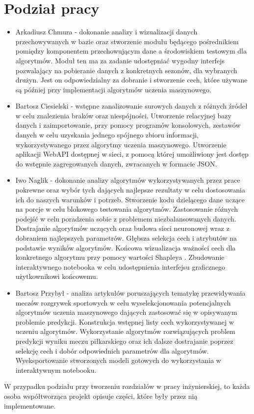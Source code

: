 \section{Podział pracy}
\begin{itemize}
    \item Arkadiusz Chmura - dokonanie analizy i wizualizacji danych przechowywanych w bazie oraz stworzenie modułu będącego pośrednikiem pomiędzy komponentem przechowującym dane a środowiskiem testowym dla algorytmów. Moduł ten ma za zadanie udostępniać wygodny interfejs pozwalający na pobieranie danych z konkretnych sezonów, dla wybranych drużyn. Jest on odpowiedzialny za dobranie i stworzenie cech, które używane są później przy implementacji algorytmów uczenia maszynowego.
    \item Bartosz Ciesielski - wstępne zanalizowanie surowych danych z różnych źródeł w celu znalezienia braków oraz niespójności. Utworzenie relacyjnej bazy danych i zaimportowanie, przy pomocy programów konsolowych, zestawów danych w celu uzyskania jednego spójnego zbioru informacji, wykorzystywanego przez algorytmy uczenia maszynowego. Utworzenie aplikacji WebAPI  dostępnej w sieci, z pomocą której umożliwiony jest dostęp do wstępnie zagregowanych danych, zwracanych w formacie JSON.
    \item Iwo Naglik - dokonanie analizy algorytmów wykorzystywanych przez prace pokrewne oraz wybór tych dających najlepsze rezultaty w celu dostosowania ich do naszych warunków i potrzeb. Stworzenie kodu dzielącego dane uczące na porcje w celu blokowego testowania algorytmów. Zastosowanie różnych podejść w celu poradzenia sobie z problemem niezbalansowanych danych. Dostrajanie algorytmów uczących oraz budowa sieci neuronowej wraz z dobraniem najlepszych parametrów. Głębsza selekcja cech i atrybutów na podstawie wyników algorytmów. Końcowa wizualizacja ważności cech dla konkretnego algorytmu przy pomocy wartości Shapleya \cite{shapley}. Zbudowanie interaktywnego notebooka w celu udostępnienia interfejsu graficznego użytkownikowi końcowemu.
    \item Bartosz Przybył - analiza artykułów poruszających tematykę przewidywania meczów rozgrywek sportowych w celu wyselekcjonowania potencjalnych algorytmów uczenia maszynowego dających zastosować się w opisywanym problemie predykcji. Konstrukcja wstępnej listy cech wykorzystywanej w uczeniu algorytmów. Wykorzystanie algorytmów rozwiązujących problem predykcji wyniku meczu piłkarskiego oraz ich dalsze dostrajanie poprzez selekcję cech i dobór odpowiednich parametrów dla algorytmów. Wyeksportowanie stworzonych modeli gotowych do wykorzystania w interaktywnym notebooku.
\end{itemize}
W przypadku podziału przy tworzeniu rozdziałów w pracy inżynierskiej, to każda osoba współtworząca projekt opisuje części, które były przez nią implementowane.